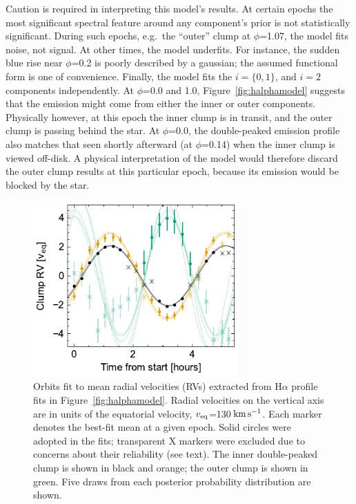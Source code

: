 \documentclass{nature3}
\newcommand{\kms}{\ensuremath{\rm km\,s^{-1}}}
\begin{document}
\begin{methods}
Caution is required in interpreting this model's results.  
At certain epochs the most significant spectral
feature around any component's prior is not statistically significant.
During such epochs, e.g.~the ``outer'' clump at $\phi$=1.07,
the model fits noise, not signal.  At other times, the model
underfits.  For instance, the sudden blue rise near $\phi$=0.2 is 
poorly described by a gaussian; the assumed functional form is one of
convenience.  Finally, the model fits the $i=\{ 0, 1 \}$, and $i=2$
components independently.  At $\phi$=0.0 and 1.0,
Figure~\ref{fig:halphamodel} suggests that the emission
might come from either the inner or outer components.
Physically however, at this epoch the inner clump
is in transit, and the outer clump is passing behind
the star.  At $\phi$=0.0, the double-peaked
emission profile also matches that seen shortly afterward (at
$\phi$=0.14) when the
inner clump is viewed off-disk.  A physical interpretation of the
model would therefore discard the outer clump results at this
particular epoch, because its emission would be blocked by the star.

\begin{figure}[!t]
  \centering
  \includegraphics[width=0.7\textwidth]{figures/sf7.pdf}
  \caption{Orbits fit to mean radial velocities (RVs) extracted from 
  H$\alpha$ profile fits in Figure~\ref{fig:halphamodel}.
  Radial velocities on the vertical axis are in units of the
  equatorial velocity, $v_{\rm eq}$=130\,\kms.
  Each marker denotes the best-fit mean at a given epoch.
  Solid circles were adopted in the fits; transparent X markers
  were excluded due to concerns about their reliability
  (see text).  The inner double-peaked clump is shown in
  black and orange; the outer clump is shown in green.  Five draws from
  each posterior probability distribution are shown.}
  \label{fig:orbits}
\end{figure}


\end{methods}
\end{document}
